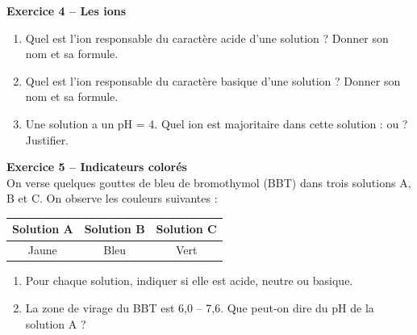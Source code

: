 \documentclass[11pt,a4paper]{article}
\begin{document}
\newpage

\textbf{Exercice 4 -- Les ions} \\

\begin{enumerate}[label=\textbf{\arabic*.}]
\item Quel est l'ion responsable du caractère acide d'une solution ? Donner son nom et sa formule.

\vspace{8mm}
\dotfill

\item Quel est l'ion responsable du caractère basique d'une solution ? Donner son nom et sa formule.

\vspace{8mm}
\dotfill

\item Une solution a un pH = 4. Quel ion est majoritaire dans cette solution :  ou  ? Justifier.

\vspace{8mm}
\dotfill

\vspace{8mm}
\dotfill
\end{enumerate}

\vspace{3mm}

\textbf{Exercice 5 -- Indicateurs colorés} \\

On verse quelques gouttes de bleu de bromothymol (BBT) dans trois solutions A, B et C. On observe les couleurs suivantes :

\vspace{3mm}

\begin{center}
\begin{tabular}{|c|c|c|}
\hline
\textbf{Solution A} & \textbf{Solution B} & \textbf{Solution C} \\
\hline
Jaune & Bleu & Vert \\
\hline
\end{tabular}
\end{center}

\vspace{3mm}

\begin{enumerate}[label=\textbf{\arabic*.}]
\item Pour chaque solution, indiquer si elle est acide, neutre ou basique.

\vspace{8mm}
\dotfill

\vspace{8mm}
\dotfill

\vspace{8mm}
\dotfill

\item La zone de virage du BBT est 6,0 -- 7,6. Que peut-on dire du pH de la solution A ?

\vspace{8mm}
\dotfill

\dotfill
\end{enumerate}
\end{document}
